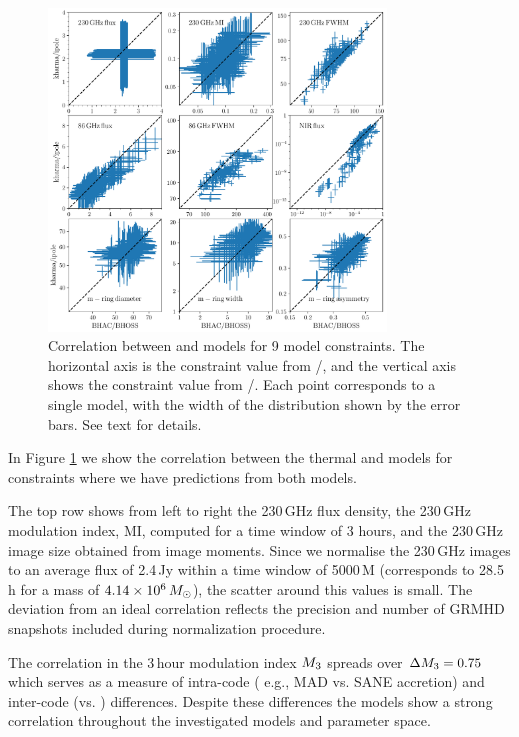 \begin{figure}
  \centering
  \includegraphics[width=0.8\textwidth]{./figures/BHAC_iharm_correlation2}
  \caption{Correlation between \bhac and \kharma models for 9 model constraints.  The horizontal axis is the constraint value from \bhac/\bhoss, and the vertical axis shows the constraint value from \kharma/\ipole.  Each point corresponds to a single model, with the width of the distribution shown by the error bars.  See text for details.}
  \label{fig:modelcorrelation}
\end{figure}

In Figure \ref{fig:modelcorrelation} we show the correlation between the thermal \kharma and \bhac models for constraints where we have predictions from both models.

The top row shows from left to right the 230\,GHz flux density, the 230\,GHz modulation index, MI, computed for a time window of 3 hours, and the 230\,GHz image size obtained from image moments. Since we normalise the 230\,GHz images to an average flux of 2.4\,Jy within a time window of 5000\,M (corresponds to 28.5 h for \sgra a mass of $4.14\times 10^6\,M_\odot$), the scatter around this values is small. The deviation from an ideal correlation reflects the precision and number of GRMHD snapshots included during normalization procedure.

The correlation in the 3\,hour modulation index $M_{3}$ spreads over $\Delta M_{3}=0.75$ which serves as a measure of intra-code ( e.g., MAD vs. SANE accretion) and inter-code (\bhac vs. \kharma) differences. Despite these differences the models show a strong correlation throughout the investigated models and parameter space.

